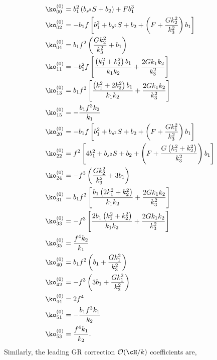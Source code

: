 \begin{align}
\ko^{(0)}_{00}&= 
b_{1}^{2}\left(b_{s^2} S+b_{2}\right)+F b_{1}^{3}
 \\ \ko^{(0)}_{02}&= - b_1f
 \left[b_{1}^{2}+b_{s^2} S +b_{2}+\left(F+\frac{G k_{2}^{2}}{k_{3}^{2}}\right) b_{1}\right]
 \\ \ko^{(0)}_{04}&= 
b_1f^2 \left(\frac{G k_{2}^{2} }{k_{3}^{2}}+b_{1}\right)
 \\ \ko^{(0)}_{11}&= 
-b_1^2f\left[\frac{\left(k_{1}^{2}+k_{2}^{2}\right) b_{1}}{k_{1} k_{2}}+\frac{2 G k_{1}  k_{2} }{k_{3}^{2}}\right] 
 \\ \ko^{(0)}_{13}&= 
 b_1f^2\left[\frac{\left(k_{1}^{2}+2 k_{2}^{2}\right) b_{1}}{k_{1} k_{2}}+\frac{2 G k_{1}  k_{2} }{k_{3}^{2}}\right]
 \\ \ko^{(0)}_{15}&= 
-\frac{b_{1}f^{3} k_{2} }{k_{1}}
 \\ \ko^{(0)}_{20}&= 
- b_1 f \left[b_{1}^{2}+b_{s^2} S + b_{2}+\left(F+\frac{G k_{1}^{2}}{k_{3}^{2}}\right) b_{1}\right]
 \\ \ko^{(0)}_{22}&= 
f^{2}\left[4 b_{1}^{2}+b_{s^2} S+b_{2}+\left(F+\frac{G\left(k_{1}^{2}+k_{2}^{2}\right)}{k_{3}^{2}}\right) b_{1}\right]
 \\ \ko^{(0)}_{24}&= 
 -f^{3}\left(\frac{G k_{2}^{2}}{k_{3}^{2}}+3 b_{1}\right) 
 \\ \ko^{(0)}_{31}&= 
b_1f^{2}\left[\frac{b_{1}\left(2 k_{1}^{2}+k_{2}^{2}\right) }{k_{1} k_{2}}+\frac{2 G k_{1}  k_{2} }{k_{3}^{2}}\right] 
 \\ \ko^{(0)}_{33}&= 
 -f^{3}\left[\frac{2b_{1}\left(k_{1}^{2}+k_{2}^{2}\right) }{k_{1} k_{2}}+\frac{2 G k_{1}  k_{2}}{k_{3}^{2}}\right]
 \\ \ko^{(0)}_{35}&= 
\frac{f^{4} k_{2}}{k_{1}}
 \\ \ko^{(0)}_{40}&= 
b_{1}f^{2}\left(b_1+\frac{G k_{1}^{2} }{k_{3}^{2}}\right) 
 \\ \ko^{(0)}_{42}&= 
 -f^3\left(3b_{{1}}+ {\frac {Gk_{{1}}^{2}}{k_{{3}}^{2}}}
 \right)
 \\ \ko^{(0)}_{44}&= 
2 f^{4}
 \\ \ko^{(0)}_{51}&= 
-\frac{ b_{1}f^{3} k_{1}}{k_{2}}
 \\ \ko^{(0)}_{53}&= 
\frac{f^{4} k_{1}}{k_{2}}.
\end{align}
Similarly, the leading GR correction \(\mathcal{O}(\cH/k)\)  coefficients are, 
